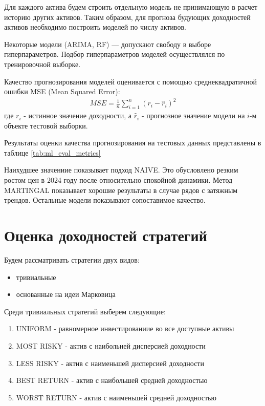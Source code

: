 Для каждого актива будем строить отдельную модель не принимающую в расчет историю других активов.
Таким образом, для прогноза будующих доходностей активов необходимо построить моделей по числу активов.

Некоторые модели (ARIMA, RF) --- допускают свободу в выборе гиперпараметров. 
Подбор гиперпараметров моделей осуществлялся по тренировочной выборке.

Качество прогнозирования моделей оценивается с помощью среднеквадратичной ошибки MSE (Mean Squared Error):
\begin{align}
	MSE = \frac{1}{n} \sum_{i=1}^{n} (r_i - \hat{r}_i)^2
\end{align}
где $r_i$ - истинное значение доходности,
а $\hat{r}_i$ - прогнозное значение модели на $i$-м объекте тестовой выборки.

Результаты оценки качества прогнозирования на тестовых данных представлены в таблице \ref{tab:ml_eval_metrics}



Наихудшее значениие показывает подход NAIVE.
Это обусловлено резким ростом цен в 2024 году после относительно спокойной динамики.
Метод MARTINGAL показывает хорошие результаты в случае рядов с затяжным трендов.
Остальные модели показывают сопоставимое качество.

\section{Оценка доходностей стратегий}

Будем рассматривать стратегии двух видов:
\begin{itemize}
	\item тривиальные 
	\item основанные на идеи Марковица
\end{itemize}

Среди тривиальных стратегий выберем следующие:
\begin{enumerate}
	\item UNIFORM - равномерное инвестированиие во все доступные активы
	\item MOST RISKY - актив с наибольней дисперсией доходности
	\item LESS RISKY - актив с наименьшей дисперсией доходности
	\item BEST RETURN - актив с наибольшей средней доходностью
	\item WORST RETURN - актив с наименьшей средней доходностью
\end{enumerate}

